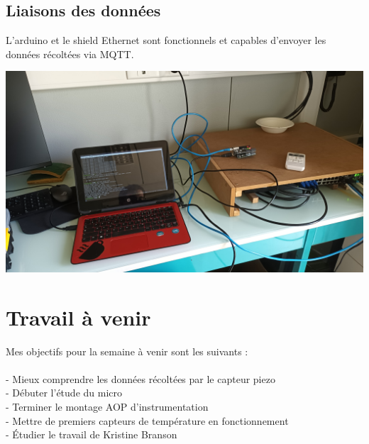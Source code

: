 \documentclass[12pt]{article}
\begin{document}
\subsection{Liaisons des données}
L'arduino et le shield Ethernet sont fonctionnels et capables d'envoyer les données récoltées via MQTT.
\begin{center}	
	\includegraphics[scale=0.08]{../img/shieldethernet.jpg}
	\label{image5}
\end{center}
\section{Travail à venir}
Mes objectifs pour la semaine à venir sont les suivants :\\
\\
	- Mieux comprendre les données récoltées par le capteur piezo\\
	- Débuter l'étude du micro\\
	- Terminer le montage AOP d'instrumentation\\
	- Mettre de premiers capteurs de température en fonctionnement\\
	- Étudier le travail de Kristine Branson\\

\newpage
\listoffigures
\end{document}
